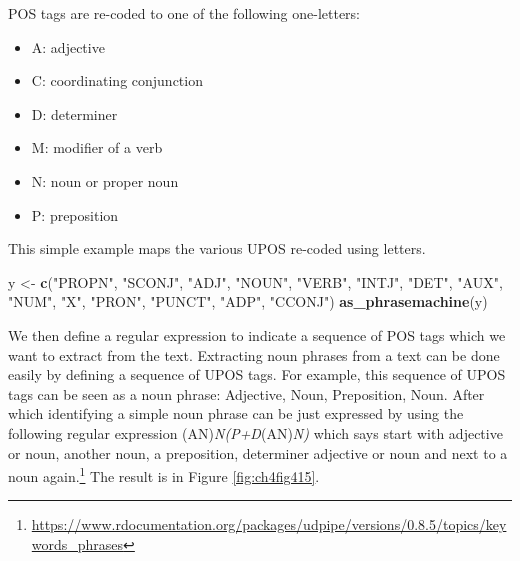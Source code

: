 \documentclass[
]{article}
\newenvironment{Shaded}{\begin{snugshade}}{\end{snugshade}}
\newcommand{\FunctionTok}[1]{\textcolor[rgb]{0.13,0.29,0.53}{\textbf{#1}}}
\newcommand{\NormalTok}[1]{#1}
\newcommand{\OtherTok}[1]{\textcolor[rgb]{0.56,0.35,0.01}{#1}}
\newcommand{\StringTok}[1]{\textcolor[rgb]{0.31,0.60,0.02}{#1}}
\providecommand{\tightlist}{%
  \setlength{\itemsep}{0pt}\setlength{\parskip}{0pt}}
\begin{document}
POS tags are re-coded to one of the following one-letters:

\begin{itemize}
\tightlist
\item
  A: adjective
\item
  C: coordinating conjunction
\item
  D: determiner
\item
  M: modifier of a verb
\item
  N: noun or proper noun
\item
  P: preposition
\end{itemize}

This simple example maps the various UPOS re-coded using letters.

\footnotesize

\begin{Shaded}
\begin{Highlighting}[]
\NormalTok{y }\OtherTok{\textless{}{-}} \FunctionTok{c}\NormalTok{(}\StringTok{"PROPN"}\NormalTok{, }\StringTok{"SCONJ"}\NormalTok{, }\StringTok{"ADJ"}\NormalTok{, }\StringTok{"NOUN"}\NormalTok{, }\StringTok{"VERB"}\NormalTok{, }\StringTok{"INTJ"}\NormalTok{, }\StringTok{"DET"}\NormalTok{, }\StringTok{"AUX"}\NormalTok{, }\StringTok{"NUM"}\NormalTok{, }\StringTok{"X"}\NormalTok{, }\StringTok{"PRON"}\NormalTok{, }\StringTok{"PUNCT"}\NormalTok{, }\StringTok{"ADP"}\NormalTok{, }\StringTok{"CCONJ"}\NormalTok{)}
\FunctionTok{as\_phrasemachine}\NormalTok{(y)}
\end{Highlighting}
\end{Shaded}

\normalsize

We then define a regular expression to indicate a sequence of POS tags which we want to extract from the text. Extracting noun phrases from a text can be done easily by defining a sequence of UPOS tags. For example, this sequence of UPOS tags can be seen as a noun phrase: Adjective, Noun, Preposition, Noun. After which identifying a simple noun phrase can be just expressed by using the following regular expression (A\textbar N)\emph{N(P+D}(A\textbar N)\emph{N)} which says start with adjective or noun, another noun, a preposition, determiner adjective or noun and next to a noun again.\footnote{\url{https://www.rdocumentation.org/packages/udpipe/versions/0.8.5/topics/keywords_phrases}} The result is in Figure \ref{fig:ch4fig415}.
\end{document}
